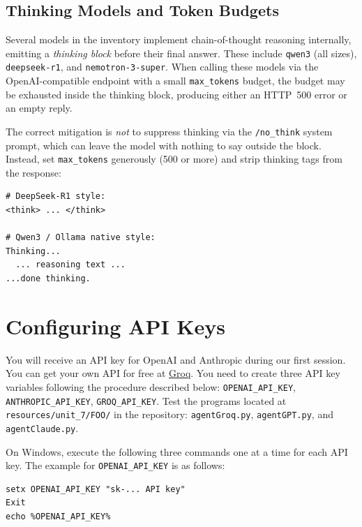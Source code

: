 \subsection{Thinking Models and Token Budgets}

Several models in the inventory implement chain-of-thought reasoning
internally, emitting a \emph{thinking block} before their final answer.
These include \texttt{qwen3} (all sizes), \texttt{deepseek-r1}, and
\texttt{nemotron-3-super}. When calling these models via the
OpenAI-compatible endpoint with a small \texttt{max\_tokens} budget, the
budget may be exhausted inside the thinking block, producing either an
HTTP~500 error or an empty reply.

The correct mitigation is \emph{not} to suppress thinking via the
\texttt{/no\_think} system prompt, which can leave the model with nothing
to say outside the block. Instead, set \texttt{max\_tokens} generously
(500 or more) and strip thinking tags from the response:

\begin{lstlisting}[style=bashstyle, caption={Thinking tag patterns to strip from model output}]
# DeepSeek-R1 style:
<think> ... </think>

# Qwen3 / Ollama native style:
Thinking...
  ... reasoning text ...
...done thinking.
\end{lstlisting}

\section{Configuring API Keys}
\label{sec:apikeys}

You will receive an API key for OpenAI and Anthropic during our first session. You can get your own API for free at \href{https://groq.com}{Groq}. You need to create three API key variables following the procedure described below: \texttt{OPENAI\_API\_KEY}, \texttt{ANTHROPIC\_API\_KEY}, \texttt{GROQ\_API\_KEY}. Test the programs located at \texttt{resources/unit\_7/FOO/} in the \ProjectName{} repository: \texttt{agentGroq.py}, \texttt{agentGPT.py}, and \texttt{agentClaude.py}.

\vs

On Windows, execute the following three commands one at a time for each API key. The example for \texttt{OPENAI\_API\_KEY} is as follows:

\begin{lstlisting}[style=bashstyle]
setx OPENAI_API_KEY "sk-... API key"
Exit
echo %OPENAI_API_KEY%
\end{lstlisting}

